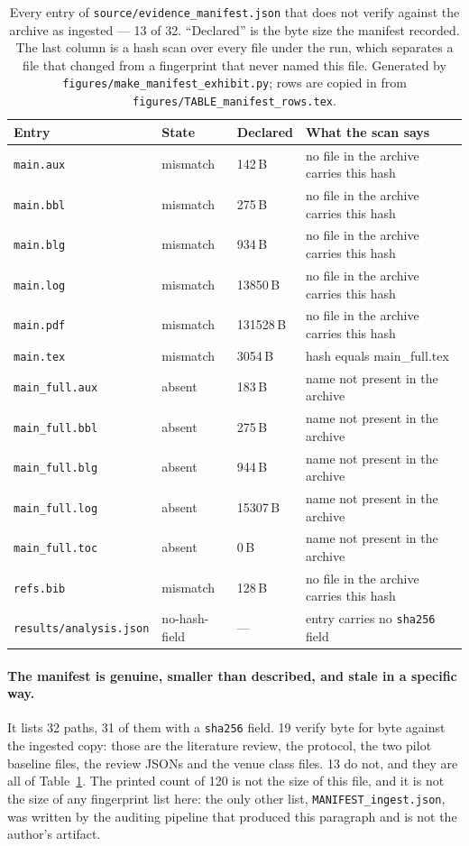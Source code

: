 \begin{table}[ht]\centering\small
\caption{Every entry of \texttt{source/evidence\_manifest.json} that does not verify against the archive as ingested --- 13 of 32. ``Declared'' is the byte size the manifest recorded. The last column is a hash scan over every file under the run, which separates a file that changed from a fingerprint that never named this file. Generated by \texttt{figures/make\_manifest\_exhibit.py}; rows are copied in from \texttt{figures/TABLE\_manifest\_rows.tex}.}
\label{tab:manifestaudit}
\begin{tabular}{llll}\toprule
Entry & State & Declared & What the scan says \\\midrule
\texttt{main.aux} & mismatch & 142\,B & no file in the archive carries this hash \\
\texttt{main.bbl} & mismatch & 275\,B & no file in the archive carries this hash \\
\texttt{main.blg} & mismatch & 934\,B & no file in the archive carries this hash \\
\texttt{main.log} & mismatch & 13850\,B & no file in the archive carries this hash \\
\texttt{main.pdf} & mismatch & 131528\,B & no file in the archive carries this hash \\
\texttt{main.tex} & mismatch & 3054\,B & hash equals main\_full.tex \\
\texttt{main\_full.aux} & absent & 183\,B & name not present in the archive \\
\texttt{main\_full.bbl} & absent & 275\,B & name not present in the archive \\
\texttt{main\_full.blg} & absent & 944\,B & name not present in the archive \\
\texttt{main\_full.log} & absent & 15307\,B & name not present in the archive \\
\texttt{main\_full.toc} & absent & 0\,B & name not present in the archive \\
\texttt{refs.bib} & mismatch & 128\,B & no file in the archive carries this hash \\
\texttt{results/analysis.json} & no-hash-field & --- & entry carries no \texttt{sha256} field \\
\bottomrule\end{tabular}\end{table}

\paragraph{The manifest is genuine, smaller than described, and stale in a specific way.} It lists 32 paths, 31 of them with a \texttt{sha256} field. 19 verify byte for byte against the ingested copy: those are the literature review, the protocol, the two pilot baseline files, the review JSONs and the venue class files. 13 do not, and they are all of Table~\ref{tab:manifestaudit}. The printed count of 120 is not the size of this file, and it is not the size of any fingerprint list here: the only other list, \texttt{MANIFEST\_ingest.json}, was written by the auditing pipeline that produced this paragraph and is not the author's artifact.

